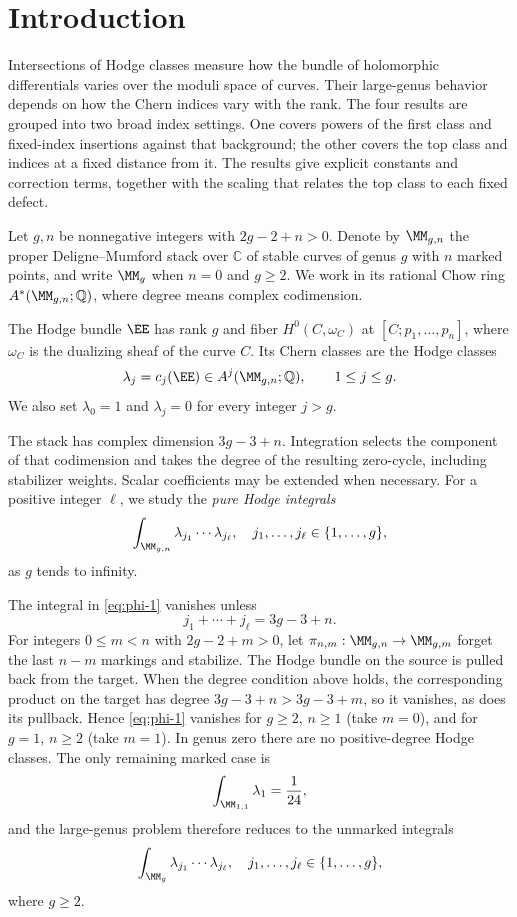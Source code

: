 \section{Introduction}
\label{sec:introduction}

Intersections of Hodge classes measure how the bundle of holomorphic
differentials varies over the moduli space of curves. Their
large-genus behavior depends on how the Chern indices vary with
the rank. The four results are grouped into two broad index
settings. One covers powers of the first class and fixed-index
insertions against that background; the other covers the top class
and indices at a fixed distance from it. The results give explicit
constants and
correction terms, together with the scaling that relates the top
class to each fixed defect.

Let $g,n$ be nonnegative integers with $2g-2+n>0$.  Denote by
$\MM_{g,n}$ the proper Deligne--Mumford stack over $\mathbb C$ of
stable curves of genus $g$ with $n$ marked points, and write $\MM_g$
when $n=0$ and $g\geq2$.  We work in its rational Chow ring
$A^*(\MM_{g,n};\mathbb Q)$, where degree means complex codimension.

The Hodge bundle $\EE$ has rank $g$ and fiber $H^0(C,\omega_C)$ at
$[C;p_1,\ldots,p_n]$, where $\omega_C$ is the dualizing sheaf of the
curve $C$.  Its Chern classes are the Hodge classes
\[\lambda_j=c_j(\EE)\in A^j(\MM_{g,n};\mathbb Q),
\qquad 1\leq j\leq g.\]
We also set $\lambda_0=1$ and $\lambda_j=0$ for every integer $j>g$.

The stack has complex dimension $3g-3+n$.  Integration selects the
component of that codimension and takes the degree of the resulting
zero-cycle, including stabilizer weights.  Scalar
coefficients may be extended when necessary.  For a positive integer
$\ell$, we study the \emph{pure Hodge integrals}
\begin{equation}
\int_{\MM_{g,n}}\lambda_{j_1}\cdots \lambda_{j_\ell},\quad j_1, \dots, j_\ell \in \{1, \dots, g\},
\label{eq:phi-1}
\end{equation}
as $g$ tends to infinity.

The integral in \eqref{eq:phi-1} vanishes unless
\[j_1+\cdots+j_\ell=3g-3+n.\]
For integers $0\leq m<n$ with $2g-2+m>0$, let
$\pi_{n,m}:\MM_{g,n}\to\MM_{g,m}$ forget the last $n-m$ markings
and stabilize.  The Hodge bundle on the source is pulled back from the
target.  When the degree condition above holds, the corresponding
product on the target has degree $3g-3+n>3g-3+m$, so it vanishes,
as does its pullback.  Hence \eqref{eq:phi-1} vanishes for $g\geq2$,
$n\geq1$ (take $m=0$), and for $g=1$, $n\geq2$ (take $m=1$).
In genus zero there are no positive-degree Hodge classes.  The only
remaining marked case is
\[\int_{\MM_{1,1}}\lambda_1=\frac{1}{24},\]
and the large-genus problem therefore reduces to the unmarked integrals
\begin{equation}
\int_{\MM_g}\lambda_{j_1}\cdots \lambda_{j_\ell},
\quad j_1, \dots, j_\ell \in \{1, \dots, g\},
\label{eq:phi-2}
\end{equation}
where $g\ge 2$.

